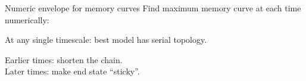 \documentclass[final,hyperref={pdfpagelabels=false,bookmarks=false}]{beamer}
\begin{document}
\begin{frame}{}
\begin{columns}[t]
\begin{column}{0.33\linewidth}

\begin{block}{Numeric envelope for memory curves}
%
 Find maximum memory curve at each time numerically:

\parbox[c]{0.45\linewidth}{
 \begin{center}
 \end{center}
}
\hspace{0.5cm}
\parbox[c]{0.45\linewidth}{
 \begin{center}
 \end{center}
}

 At any single timescale: best model has serial topology.
 \hspace{1cm}
 \parbox[t]{0.5\linewidth}{
 Earlier times: shorten the chain.\\
 Later times: make end state ``sticky''.
 }
%
\end{block}





\end{column}
\end{columns}
\end{frame}
\end{document}
